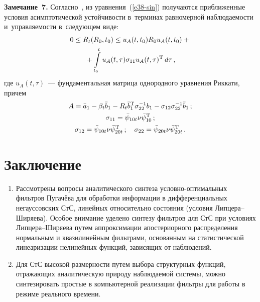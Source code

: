 \begin{multicols}{2}
\smallskip

\noindent
\textbf{Замечание~7.}
Согласно~\cite{2-sin, 3-sin}, из уравнения~(\ref{e38-sin}) получаются приближенные условия асимптотической устойчивости в~терминах равномерной наблюда\-емости и~управляемости в~следующем виде:
    \begin{multline*}
    0\le R_t (R_0, t_0) \le u_A (t, t_0) R_0 u_A(t, t_0) +{}\\
     {}+\int\limits_{t_0}^t u_A (t,\tau) \sigma_{11} u_A (t, \tau)^{\mathrm{T}}\, d\tau\,,
    \end{multline*}
где $u_A (t,\tau)$~--- фундаментальная матрица однородного уравнения Риккати, причем
   \begin{gather*}
    A =\bar a_1 -\beta_t \bar b_1 - R_t \bar b_1^{\mathrm{T}} \si_{22}^{-1} b_1- \si_{12} \si_{22}^{-1} \bar b_1\,; %
    \\
    \si_{11}= \bar\psi_{10t}\nu\bar\psi_{10}^{\mathrm{T}}\,;\\
     \si_{12}= \bar\psi_{10 t}\nu\bar\psi_{20t}^{\mathrm{T}}\,;\quad
      \si_{22} = \bar\psi_{20t}\nu\bar\psi_{20t}^{\mathrm{T}}\,.\label{e41-sin}
    \end{gather*}

    \vspace*{-18pt}


\section{Заключение}

\vspace*{-4pt}

\noindent
\begin{enumerate}[1.]
\item Рассмотрены вопросы аналитического синтеза услов\-но-оп\-ти\-маль\-ных фильтров Пугачёва для обработки информации в дифференциальных негауссовских СтС, линейных относитель\-но состояния (условия Лип\-це\-ра--Ши\-ря\-ева). Особое внимание уделено синтезу фильт\-ров для СтС при условиях Лип\-це\-ра--Ши\-ря\-ева путем аппроксимации апостериорного распределения нормальным и квазилинейным фильт\-ра\-ми, основанным на статистической линеаризации нелинейных функций, зависящих от наблюдений.

\item Для СтС высокой размерности путем выбора структурных функций, отражающих аналитическую природу наблюдаемой системы, можно синтезировать простые в компьютерной реализации фильтры для работы в режиме реального времени.


\end{enumerate}
\end{multicols}
